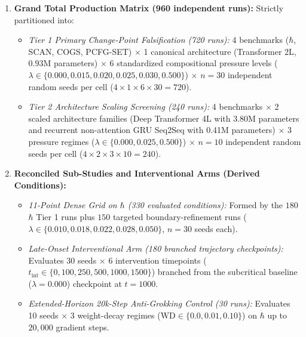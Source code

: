\documentclass{article}
\theoremstyle{plain}
\theoremstyle{definition}
\begin{document}
\begin{enumerate}[leftmargin=*,noitemsep]
    \item \textbf{Grand Total Production Matrix (960 independent runs):} Strictly partitioned into:
    \begin{itemize}[noitemsep]
        \item \emph{Tier 1 Primary Change-Point Falsification (720 runs):} 4 benchmarks ($\hbar$, SCAN, COGS, PCFG-SET) $\times$ 1 canonical architecture (Transformer 2L, $0.93\text{M}$ parameters) $\times$ 6 standardized compositional pressure levels ($\lambda \in \{0.000, 0.015, 0.020, 0.025, 0.030, 0.500\}$) $\times$ $n = 30$ independent random seeds per cell ($4 \times 1 \times 6 \times 30 = 720$).
        \item \emph{Tier 2 Architecture Scaling Screening (240 runs):} 4 benchmarks $\times$ 2 scaled architecture families (Deep Transformer 4L with 3.80M parameters and recurrent non-attention GRU Seq2Seq with 0.41M parameters) $\times$ 3 pressure regimes ($\lambda \in \{0.000, 0.025, 0.500\}$) $\times$ $n = 10$ independent random seeds per cell ($4 \times 2 \times 3 \times 10 = 240$).
    \end{itemize}
    \item \textbf{Reconciled Sub-Studies and Interventional Arms (Derived Conditions):}
    \begin{itemize}[noitemsep]
        \item \emph{11-Point Dense Grid on $\hbar$ (330 evaluated conditions):} Formed by the $180$ $\hbar$ Tier 1 runs plus $150$ targeted boundary-refinement runs ($\lambda \in \{0.010, 0.018, 0.022, 0.028, 0.050\}$, $n=30$ seeds each).
        \item \emph{Late-Onset Interventional Arm (180 branched trajectory checkpoints):} Evaluates 30 seeds $\times$ 6 intervention timepoints ($t_{\text{int}} \in \{0, 100, 250, 500, 1000, 1500\}$) branched from the subcritical baseline ($\lambda = 0.000$) checkpoint at $t=1000$.
        \item \emph{Extended-Horizon 20k-Step Anti-Grokking Control (30 runs):} Evaluates 10 seeds $\times$ 3 weight-decay regimes ($\text{WD} \in \{0.0, 0.01, 0.10\}$) on $\hbar$ up to $20{,}000$ gradient steps.
    \end{itemize}
\end{enumerate}
\end{document}
